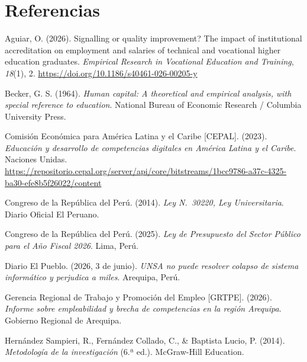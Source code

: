 \documentclass[11pt, a4paper]{article}
\begin{document}
\section*{Referencias}

\noindent\hangindent=1.27cm
Aguiar, O. (2026). Signalling or quality improvement? The impact of institutional accreditation on employment and salaries of technical and vocational higher education graduates. \textit{Empirical Research in Vocational Education and Training}, \textit{18}(1), 2. \url{https://doi.org/10.1186/s40461-026-00205-y}

\vspace{0.2cm}
\noindent\hangindent=1.27cm
Becker, G. S. (1964). \textit{Human capital: A theoretical and empirical analysis, with special reference to education}. National Bureau of Economic Research / Columbia University Press.

\vspace{0.2cm}
\noindent\hangindent=1.27cm
Comisión Económica para América Latina y el Caribe [CEPAL]. (2023). \textit{Educación y desarrollo de competencias digitales en América Latina y el Caribe}. Naciones Unidas. \url{https://repositorio.cepal.org/server/api/core/bitstreams/1bcc9786-a37c-4325-ba30-efe8b5f26022/content}

\vspace{0.2cm}
\noindent\hangindent=1.27cm
Congreso de la República del Perú. (2014). \textit{Ley N.\textdegree~30220, Ley Universitaria}. Diario Oficial El Peruano.

\vspace{0.2cm}
\noindent\hangindent=1.27cm
Congreso de la República del Perú. (2025). \textit{Ley de Presupuesto del Sector Público para el Año Fiscal 2026}. Lima, Perú.

\vspace{0.2cm}
\noindent\hangindent=1.27cm
Diario El Pueblo. (2026, 3 de junio). \textit{UNSA no puede resolver colapso de sistema informático y perjudica a miles}. Arequipa, Perú.

\vspace{0.2cm}
\noindent\hangindent=1.27cm
Gerencia Regional de Trabajo y Promoción del Empleo [GRTPE]. (2026). \textit{Informe sobre empleabilidad y brecha de competencias en la región Arequipa}. Gobierno Regional de Arequipa.

\vspace{0.2cm}
\noindent\hangindent=1.27cm
Hernández Sampieri, R., Fernández Collado, C., \& Baptista Lucio, P. (2014). \textit{Metodología de la investigación} (6.ª ed.). McGraw-Hill Education.
\end{document}
